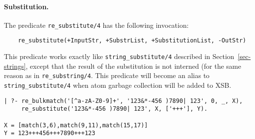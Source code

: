 \paragraph{Substitution.}
The predicate \verb|re_substitute/4| has the following invocation:
\begin{verbatim}
    re_substitute(+InputStr, +SubstrList, +SubstitutionList, -OutStr)  
\end{verbatim}
This predicate works exactly like {\tt string\_substitute/4} described in
Section~\ref{sec-strings}, except that the result of the substitution is
not interned (for the same reason as in {\tt re\_substring/4}. This
predicate will become an alias to {\tt string\_substitute/4} when atom
garbage collection will be added to XSB.
\begin{verbatim}
| ?- re_bulkmatch('[^a-zA-Z0-9]+', '123&*-456 )7890| 123', 0, _, X),
     re_substitute('123&*-456 )7890| 123', X, ['+++'], Y).

X = [match(3,6),match(9,11),match(15,17)]
Y = 123+++456+++7890+++123
\end{verbatim}


